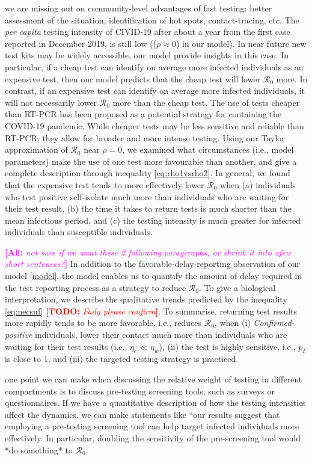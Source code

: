 \documentclass[12pt]{article}
\newcommand{\percap}{\emph{per capita}\xspace}
\newcommand{\Rnum}{\mathcal{R}_0}
\newcommand{\comment}{\showcomment}
\newcommand{\showcomment}[3]{\textcolor{#1}{\textbf{[#2: }\textsl{#3}\textbf{]}}}
\newcommand{\ali}[1]{\comment{magenta}{Ali}{#1}}
\newcommand{\todo}[1]{\comment{red}{TODO}{#1}}
\theoremstyle{definition} %
\begin{document}
we are missing out on
community-level advantages of fast testing: better assessment of the
situation, identification of hot spots, contact-tracing, etc.
The \percap testing intensity of CIVID-19 after about a year from the first case reported in December 2019, is still low (($\rho \approx 0$) in our model). In near future new test kits may be widely accessible, our model provide insights in this case. 
In particular, if a cheap test can identify on average more infected individuals as an expensive test, then our model predicts that the cheap test will lower $\Rnum$ more. In contrast, if an expensive test can identify on average more infected individuals, it will not necessarily lower $\Rnum$ more than the cheap test. The use of tests cheaper than RT-PCR has been proposed as a potential strategy for containing the COVID-19 pandemic. While cheaper tests may be less sensitive and reliable than RT-PCR, they allow for broader and more intense testing. Using our Taylor approximation of $\Rnum$ near $\rho = 0$, we examined what circumstances (i.e., model parameters) make the use of one test more favourable than another, and give a complete description through inequality \ref{eq:rho1vsrho2}. In general, we found that the expensive test tends to more effectively lower $\Rnum$ when (a) individuals who test positive self-isolate much more than individuals who are waiting for their test result, (b) the time it takes to return tests is much shorter than the mean infectious period, and (c) the testing intensity is much greater for infected individuals than susceptible individuals.

\ali{ not sure if we want these 2 following parageraphs, or shrink it into afew short sentences?}
In addition to the favorable-delay-reporting observation of our model \eqref{model}, the model enables us to quantify the amount of delay required in the test reporting process as a strategy to reduce $\Rnum$.
To give a biological interpretation, we describe the qualitative trends predicted by the inequality \eqref{eq:necsuf} \todo{Fady please confirm}. To summarise, returning test results more rapidly tends to be more favorable, i.e., reduces $\Rnum$, when (i) \emph{Confirmed-positive} individuals, lower their contact much more than individuals who are waiting for their test results (i.e., $\eta_c \ll \eta_w$), (ii) the test is highly sensitive, i.e., $p_I$ is close to 1, and (iii) the targeted testing strategy is practiced. 

one point we can make when discussing the relative weight of testing in different compartments is to discuss pre-testing screening tools, such as surveys or questionnaires. If we have a quantitative description of how the testing intensities affect the dynamics, we can make statements like ``our results suggest that employing a pre-testing screening tool can help target infected individuals more effectively. In particular, doubling the sensitivity of the pre-screening tool would *do something* to $\Rnum$.
\end{document}
